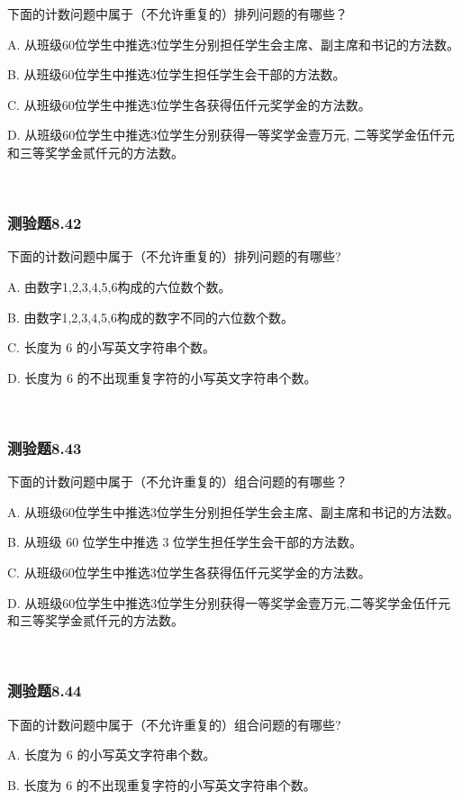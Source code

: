 \documentclass[UTF8, heading=true]{ctexart}
\begin{document}
下面的计数问题中属于（不允许重复的）排列问题的有哪些？

A. 从班级60位学生中推选3位学生分别担任学生会主席、副主席和书记的方法数。

B. 从班级60位学生中推选3位学生担任学生会干部的方法数。

C. 从班级60位学生中推选3位学生各获得伍仟元奖学金的方法数。

D. 从班级60位学生中推选3位学生分别获得一等奖学金壹万元, 二等奖学金伍仟元和三等奖学金贰仟元的方法数。

\textcolor{white}{答案：AD}

\subsubsection{测验题8.42}

下面的计数问题中属于（不允许重复的）排列问题的有哪些?

A. 由数字1,2,3,4,5,6构成的六位数个数。

B. 由数字1,2,3,4,5,6构成的数字不同的六位数个数。

C. 长度为 6 的小写英文字符串个数。

D. 长度为 6 的不出现重复字符的小写英文字符串个数。

\textcolor{white}{答案：BD}

\subsubsection{测验题8.43}

下面的计数问题中属于（不允许重复的）组合问题的有哪些？

A. 从班级60位学生中推选3位学生分别担任学生会主席、副主席和书记的方法数。

B. 从班级 60 位学生中推选 3 位学生担任学生会干部的方法数。

C. 从班级60位学生中推选3位学生各获得伍仟元奖学金的方法数。

D. 从班级60位学生中推选3位学生分别获得一等奖学金壹万元,二等奖学金伍仟元和三等奖学金贰仟元的方法数。

\textcolor{white}{答案：BC}

\subsubsection{测验题8.44}

下面的计数问题中属于（不允许重复的）组合问题的有哪些?

A. 长度为 6 的小写英文字符串个数。

B. 长度为 6 的不出现重复字符的小写英文字符串个数。
\end{document}
